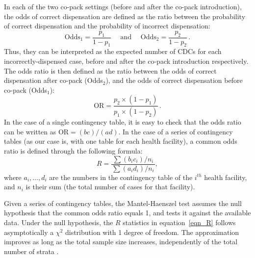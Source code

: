 \documentclass[a4paper, 12pt]{article}
\begin{document}

In each of the two co-pack settings (before and after the co-pack introduction), the odds of correct dispensation are defined as the ratio between the probability of correct dispensation and the probability of incorrect dispensation: 
$$
\text{Odds}_1 = \frac{p_1}{1-p_1} 
\quad \text{ and } \quad
\text{Odds}_2 = \frac{p_2}{1-p_2}\,.
$$
Thus, they can be interpreted as the expected number of CDCs for each incorrectly-dispensed case, before and after the co-pack introduction respectively.
The odds ratio is then defined as the ratio between the odds of correct dispensation after co-pack (Odds$_2$), and the odds of correct dispensation before co-pack (Odds$_1$):
$$
\text{OR} = \frac{p_2 \times (1-p_1)}{p_1 \times (1-p_2)}\,.
$$
In the case of a single contingency table, it is easy to check that the odds ratio can be written as $\text{OR} = (bc)/(ad)$. 
In the case of a series of contingency tables (as our case is, with one table for each health facility), a common odds ratio is defined through the following formula:
\begin{equation}\label{eqn_R}
R %
= \frac{\,\sum (b_i c_i)/n_i\,}{\sum (a_i d_i)/n_i},
\end{equation}
where $a_i, \dots, d_i$ are the numbers in the contingency table of the $i^{th}$ health facility, and $n_i$ is their sum (the total number of cases for that facility).

Given a series of contingency tables, the Mantel-Haenszel test assumes the null hypothesis that the common odds ratio equals 1, and tests it against the available data. Under the null hypothesis, the $R$ statistics in equation~\eqref{eqn_R} follows asymptotically a $\chi^2$ distribution with 1 degree of freedom. The approximation improves as long as the total sample size increases, independently of the total number of strata \cite{agresti2002}.
\end{document}
